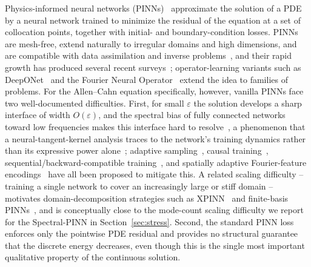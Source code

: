 \documentclass[symmetry,article,submit,moreauthors]{Definitions/mdpi}
\begin{document}
Physics-informed neural networks (PINNs)~\cite{Raissi} approximate the solution of a PDE by a neural network trained to minimize the residual of the equation at a set of collocation points, together with initial- and boundary-condition losses. PINNs are mesh-free, extend naturally to irregular domains and high dimensions, and are compatible with data assimilation and inverse problems~\cite{Karniadakis2021,Yang_PINN,Lu_DeepXDE}, and their rapid growth has produced several recent surveys~\cite{Khanra2026,Pateras2023}; operator-learning variants such as DeepONet~\cite{Lu_DeepONet,Li_DeepONetExt2025} and the Fourier Neural Operator~\cite{Li_FNO} extend the idea to families of problems. For the Allen--Cahn equation specifically, however, vanilla PINNs face two well-documented difficulties. First, for small $\varepsilon$ the solution develops a sharp interface of width $O(\varepsilon)$, and the spectral bias of fully connected networks toward low frequencies makes this interface hard to resolve~\cite{Wight}, a phenomenon that a neural-tangent-kernel analysis traces to the network's training dynamics rather than its expressive power alone~\cite{Wang_NTK2022}; adaptive sampling~\cite{Wight}, causal training~\cite{Wang_causal}, sequential/backward-compatible training~\cite{Mattey}, and spatially adaptive Fourier-feature encodings~\cite{Liu_FourierBias2025} have all been proposed to mitigate this. A related scaling difficulty -- training a single network to cover an increasingly large or stiff domain -- motivates domain-decomposition strategies such as XPINN~\cite{Jagtap_XPINN2020} and finite-basis PINNs~\cite{Moseley_FBPINN2023}, and is conceptually close to the mode-count scaling difficulty we report for the Spectral-PINN in Section~\ref{sec:stress}. Second, the standard PINN loss enforces only the pointwise PDE residual and provides no structural guarantee that the discrete energy decreases, even though this is the single most important qualitative property of the continuous solution.
\end{document}
